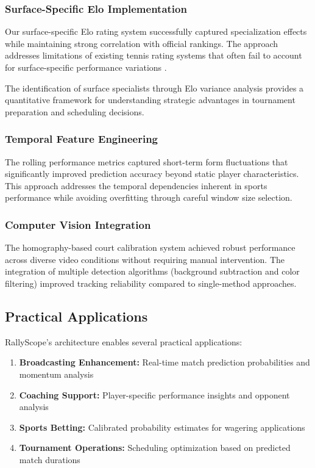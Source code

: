 \documentclass[11pt,a4paper]{article}
\begin{document}
\subsubsection{Surface-Specific Elo Implementation}

Our surface-specific Elo rating system successfully captured specialization effects while maintaining strong correlation with official rankings. The approach addresses limitations of existing tennis rating systems that often fail to account for surface-specific performance variations \citep{martinez2013movement}.

The identification of surface specialists through Elo variance analysis provides a quantitative framework for understanding strategic advantages in tournament preparation and scheduling decisions.

\subsubsection{Temporal Feature Engineering}

The rolling performance metrics captured short-term form fluctuations that significantly improved prediction accuracy beyond static player characteristics. This approach addresses the temporal dependencies inherent in sports performance while avoiding overfitting through careful window size selection.

\subsubsection{Computer Vision Integration}

The homography-based court calibration system achieved robust performance across diverse video conditions without requiring manual intervention. The integration of multiple detection algorithms (background subtraction and color filtering) improved tracking reliability compared to single-method approaches.

\subsection{Practical Applications}

RallyScope's architecture enables several practical applications:

\begin{enumerate}
    \item \textbf{Broadcasting Enhancement:} Real-time match prediction probabilities and momentum analysis
    \item \textbf{Coaching Support:} Player-specific performance insights and opponent analysis
    \item \textbf{Sports Betting:} Calibrated probability estimates for wagering applications
    \item \textbf{Tournament Operations:} Scheduling optimization based on predicted match durations
\end{enumerate}
\end{document}
